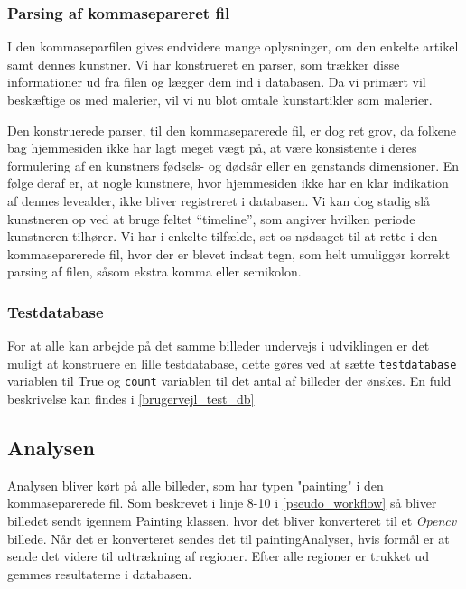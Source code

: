 {\subsubsection{Parsing af kommasepareret fil}
I den kommaseparfilen gives endvidere mange oplysninger, om den enkelte artikel samt
dennes kunstner.  Vi har konstrueret en parser, som trækker disse
informationer ud fra filen og lægger dem ind i databasen. Da vi primært
vil beskæftige os med malerier, vil vi nu blot omtale kunstartikler som
malerier.

Den konstruerede parser, til den kommaseparerede fil, er dog ret grov,
da folkene bag hjemmesiden \cite{wgahu} ikke har lagt meget vægt på, at være
konsistente i deres formulering af en kunstners fødsels- og dødsår eller
en genstands dimensioner. En følge deraf er, at nogle kunstnere, hvor
hjemmesiden\cite{wgahu} ikke har en klar indikation af dennes levealder, ikke
bliver registreret i databasen. Vi kan dog stadig slå kunstneren op ved
at bruge feltet ``timeline'', som angiver hvilken periode kunstneren
tilhører. Vi har i enkelte tilfælde, set os nødsaget til at rette i den
kommaseparerede fil, hvor der er blevet indsat tegn, som helt umuliggør
korrekt parsing af filen, såsom ekstra komma eller semikolon.

\subsubsection{Testdatabase}\label{test_db}
For at alle kan arbejde på det samme billeder undervejs i udviklingen er
det muligt at konstruere en lille testdatabase, dette gøres ved at sætte
\texttt{testdatabase} variablen til True og 
\texttt{count} variablen til det antal af billeder der ønskes. En fuld beskrivelse kan findes i \ref{brugervejl_test_db}


\subsection{Analysen}
Analysen bliver kørt på alle billeder, som har typen "painting" i den
kommaseparerede fil. Som beskrevet i linje 8-10 i \ref{pseudo_workflow}
så bliver billedet sendt igennem Painting klassen, hvor det bliver
konverteret til et \emph{Opencv} billede. Når det er konverteret sendes
det til paintingAnalyser, hvis formål er at sende det videre til
udtrækning af regioner. Efter alle regioner er trukket ud gemmes
resultaterne i databasen.

}
